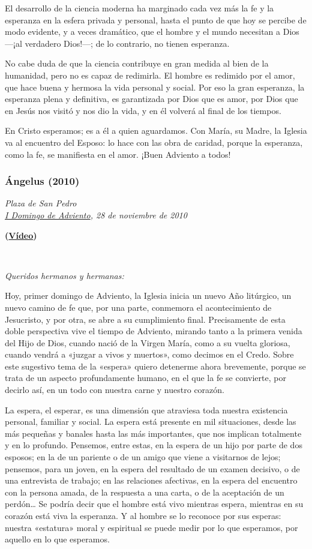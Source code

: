 El desarrollo de la ciencia moderna ha marginado cada vez más la fe y la
esperanza en la esfera privada y personal, hasta el punto de que hoy se
percibe de modo evidente, y a veces dramático, que el hombre y el mundo
necesitan a Dios ---¡al verdadero Dios!---; de lo contrario, no tienen
esperanza.

No cabe duda de que la ciencia contribuye en gran medida al bien de la
humanidad, pero no es capaz de redimirla. El hombre es redimido por el
amor, que hace buena y hermosa la vida personal y social. Por eso la
gran esperanza, la esperanza plena y definitiva, es garantizada por Dios
que es amor, por Dios que en Jesús nos visitó y nos dio la vida, y en él
volverá al final de los tiempos.

En Cristo esperamos; es a él a quien aguardamos. Con María, su Madre, la
Iglesia va al encuentro del Esposo: lo hace con las obra de caridad,
porque la esperanza, como la fe, se manifiesta en el amor. ¡Buen
Adviento a todos!


\subsubsection{Ángelus (2010)}
\emph{Plaza de San Pedro\\
	\href{http://www.vatican.va/liturgical_year/advent/2010/index_sp.html\#I\%20DOMENICA\%20DI\%20AVVENTO}{I
		Domingo de Adviento}, 28 de noviembre de 2010}

\textbf{(\href{http://youtu.be/khd9HPcP3e8}{Vídeo})}

~

\emph{Queridos hermanos y hermanas:}

Hoy, primer domingo de Adviento, la Iglesia inicia un nuevo Año
litúrgico, un nuevo camino de fe que, por una parte, conmemora el
acontecimiento de Jesucristo, y por otra, se abre a su cumplimiento
final. Precisamente de esta doble perspectiva vive el tiempo de
Adviento, mirando tanto a la primera venida del Hijo de Dios, cuando
nació de la Virgen María, como a su vuelta gloriosa, cuando vendrá a
«juzgar a vivos y muertos», como decimos en el Credo. Sobre este
sugestivo tema de la «espera» quiero detenerme ahora brevemente, porque
se trata de un aspecto profundamente humano, en el que la fe se
convierte, por decirlo así, en un todo con nuestra carne y nuestro
corazón.

La espera, el esperar, es una dimensión que atraviesa toda nuestra
existencia personal, familiar y social. La espera está presente en mil
situaciones, desde las más pequeñas y banales hasta las más importantes,
que nos implican totalmente y en lo profundo. Pensemos, entre estas, en
la espera de un hijo por parte de dos esposos; en la de un pariente o de
un amigo que viene a visitarnos de lejos; pensemos, para un joven, en la
espera del resultado de un examen decisivo, o de una entrevista de
trabajo; en las relaciones afectivas, en la espera del encuentro con la
persona amada, de la respuesta a una carta, o de la aceptación de un
perdón\ldots{} Se podría decir que el hombre está vivo mientras espera,
mientras en su corazón está viva la esperanza. Y al hombre se lo
reconoce por sus esperas: nuestra «estatura» moral y espiritual se puede
medir por lo que esperamos, por aquello en lo que esperamos.

